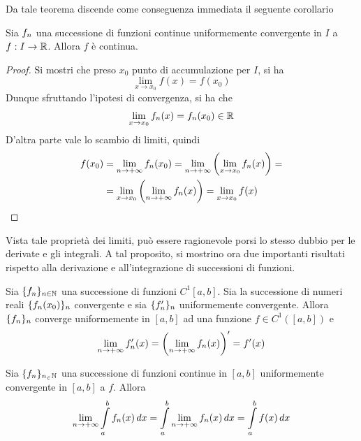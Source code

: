 Da tale teorema discende come conseguenza immediata il seguente corollario
\begin{corollary} \label{Cor: Corollario a scambio limiti}
    Sia $f_n$ una successione di funzioni continue uniformemente convergente in $I$ a $f:I \to \mathbb{R}$. Allora $f$ è continua. 
\end{corollary}
\begin{proof}
    Si mostri che preso $x_0$ punto di accumulazione per $I$, si ha
    \begin{equation*}
        \lim_{x \to x_0}{f(x)}= f(x_0)
    \end{equation*}
    Dunque sfruttando l'ipotesi di convergenza, si ha che
    \begin{equation*}
        \lim_{x \to x_0}{f_n(x)}= f_n(x_0) \in \mathbb{R}
    \end{equation*}
    D'altra parte vale lo scambio di limiti, quindi
    \begin{equation*}
    \begin{aligned}
          f(x_0) &=  \lim_{n \to +\infty}{f_n(x_0)}= \lim_{n \to +\infty}{\left(\lim_{x \to x_0}{f_n(x)}\right)}=\\
          &= \lim_{x \to x_0}{ \left( \lim_{n \to +\infty}{f_n(x)}\right)}=\lim_{x \to x_0}{f(x)} 
    \end{aligned}
    \end{equation*}
\end{proof}
Vista tale proprietà dei limiti, può essere ragionevole porsi lo stesso dubbio per le derivate e gli integrali. A tal proposito, si mostrino ora due importanti risultati rispetto alla derivazione e all'integrazione di successioni di funzioni.
\begin{theorem} \label{Teo: Passaggio al limite sotto al segno di derivata}
    Sia $\{f_n\}_{n\in\mathbb{N}}$ una successione di funzioni $C^1[a,b]$. Sia la successione di numeri reali $\{f_n(x_0)\}_n$ convergente e sia $\{f_n'\}_n$ uniformemente convergente. Allora $\{f_n\}_n$ converge uniformemente in $[a,b]$ ad una funzione $f \in C^1([a,b])$ e 
    \begin{equation*}
        \lim_{n \to +\infty}{f_n'(x)}= \left(\lim_{n \to +\infty}{f_n(x)}\right)'=f'(x)
    \end{equation*}
\end{theorem}
\begin{theorem} \label{Teo: Passaggio al limite sotto al segno di integrale}
Sia $\{f_n\}_{n_\in \mathbb{N}}$ una successione di funzioni continue in $[a,b]$ uniformemente convergente in $[a,b]$ a $f$. Allora
\begin{equation*}
    \lim_{n \to +\infty}{\int\limits_{a}^{b}{f_n(x)}\,dx}=\int\limits_{a}^{b}{\lim_{n \to +\infty}{f_n(x)}\,dx}= \int\limits_{a}^{b}{f(x)}\,dx
\end{equation*}
\end{theorem}
